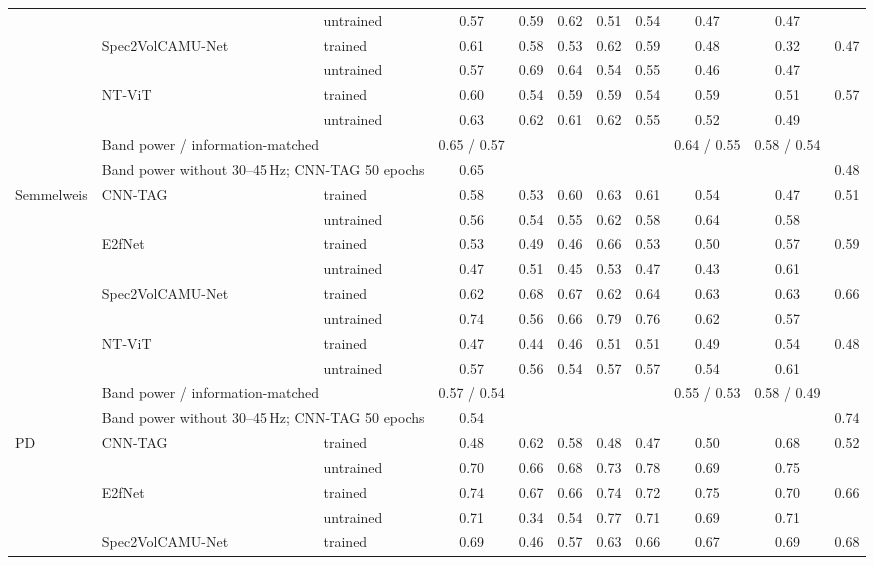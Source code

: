 \documentclass[10pt]{article}
\begin{document}
\begin{longtable}{l l l c c c c c c c c}
 &  & untrained & 0.57 & 0.59 & 0.62 & 0.51 & 0.54 & 0.47 & 0.47 &  \\
 & Spec2VolCAMU-Net & trained & 0.61 & 0.58 & 0.53 & 0.62 & 0.59 & 0.48 & 0.32 & 0.47 \\
 &  & untrained & 0.57 & 0.69 & 0.64 & 0.54 & 0.55 & 0.46 & 0.47 &  \\
 & NT-ViT & trained & 0.60 & 0.54 & 0.59 & 0.59 & 0.54 & 0.59 & 0.51 & 0.57 \\
 &  & untrained & 0.63 & 0.62 & 0.61 & 0.62 & 0.55 & 0.52 & 0.49 &  \\
 & \multicolumn{2}{l}{Band power / information-matched} & 0.65 / 0.57 & & & & & 0.64 / 0.55 & 0.58 / 0.54 & \\
 & \multicolumn{2}{l}{Band power without 30--45\,Hz; CNN-TAG 50 epochs} & 0.65 & & & & & & & 0.48 \\ \midrule
Semmelweis & CNN-TAG & trained & 0.58 & 0.53 & 0.60 & 0.63 & 0.61 & 0.54 & 0.47 & 0.51 \\
 &  & untrained & 0.56 & 0.54 & 0.55 & 0.62 & 0.58 & 0.64 & 0.58 &  \\
 & E2fNet & trained & 0.53 & 0.49 & 0.46 & 0.66 & 0.53 & 0.50 & 0.57 & 0.59 \\
 &  & untrained & 0.47 & 0.51 & 0.45 & 0.53 & 0.47 & 0.43 & 0.61 &  \\
 & Spec2VolCAMU-Net & trained & 0.62 & 0.68 & 0.67 & 0.62 & 0.64 & 0.63 & 0.63 & 0.66 \\
 &  & untrained & 0.74 & 0.56 & 0.66 & 0.79 & 0.76 & 0.62 & 0.57 &  \\
 & NT-ViT & trained & 0.47 & 0.44 & 0.46 & 0.51 & 0.51 & 0.49 & 0.54 & 0.48 \\
 &  & untrained & 0.57 & 0.56 & 0.54 & 0.57 & 0.57 & 0.54 & 0.61 &  \\
 & \multicolumn{2}{l}{Band power / information-matched} & 0.57 / 0.54 & & & & & 0.55 / 0.53 & 0.58 / 0.49 & \\
 & \multicolumn{2}{l}{Band power without 30--45\,Hz; CNN-TAG 50 epochs} & 0.54 & & & & & & & 0.74 \\ \midrule
PD & CNN-TAG & trained & 0.48 & 0.62 & 0.58 & 0.48 & 0.47 & 0.50 & 0.68 & 0.52 \\
 &  & untrained & 0.70 & 0.66 & 0.68 & 0.73 & 0.78 & 0.69 & 0.75 &  \\
 & E2fNet & trained & 0.74 & 0.67 & 0.66 & 0.74 & 0.72 & 0.75 & 0.70 & 0.66 \\
 &  & untrained & 0.71 & 0.34 & 0.54 & 0.77 & 0.71 & 0.69 & 0.71 &  \\
 & Spec2VolCAMU-Net & trained & 0.69 & 0.46 & 0.57 & 0.63 & 0.66 & 0.67 & 0.69 & 0.68 \\

\end{longtable}
\end{document}
